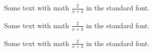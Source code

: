 \documentclass{article}
\newenvironment{myenv}{\ocrfamily}{}
\begin{document}
Some text with math $\frac{2}{x+4}$ in the standard font.

\begin{myenv}
	Some text with math $\frac{2}{x+4}$ in the standard font.
\end{myenv}

Some text with math $\frac{2}{x+4}$ in the standard font.
\end{document}
